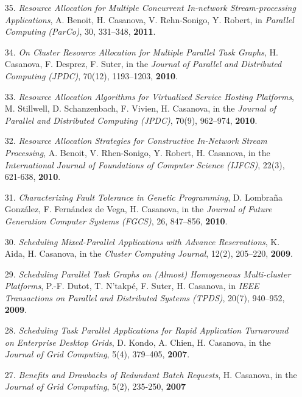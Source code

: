 \begin{enumerate}
\item[35.] {\it Resource Allocation for Multiple Concurrent In-network Stream-processing Applications}, A. Benoit, H. Casanova, V. Rehn-Sonigo, Y. Robert, in \emph{Parallel Computing (ParCo)}, 30, 331--348, {\bf 2011}.

\item[34.] {\it On Cluster Resource Allocation for Multiple Parallel Task Graphs}, H. Casanova, F. Desprez, F. Suter, in the \emph{Journal of Parallel and Distributed Computing (JPDC)}, 70(12), 1193--1203, {\bf 2010}.

\item[33.] {\it Resource Allocation Algorithms for Virtualized Service Hosting Platforms}, M. Stillwell, D. Schanzenbach, F. Vivien, H. Casanova, in the \emph{Journal of Parallel and Distributed Computing (JPDC)}, 70(9), 962--974, {\bf 2010}.

\item[32.] {\it Resource Allocation Strategies for Constructive In-Network Stream Processing}, A. Benoit, V. Rhen-Sonigo, Y. Robert, H. Casanova, in the \emph{International Journal of Foundations of Computer Science (IJFCS)}, 22(3), 621-638, {\bf 2010}.

\item[31.] {\it Characterizing Fault Tolerance in Genetic Programming}, D. Lombraña González, F. Fernández de Vega, H. Casanova, in the \emph{Journal of Future Generation Computer Systems (FGCS)}, 26, 847--856, {\bf 2010}.

\item[30.] {\it Scheduling Mixed-Parallel Applications with Advance
Reservations}, K. Aida, H. Casanova, in the \emph{Cluster Computing
Journal}, 12(2), 205--220, {\bf 2009}.

\item[29.] {\it Scheduling Parallel Task Graphs on (Almost) Homogeneous
Multi-cluster Platforms}, P.-F. Dutot, T. N'takp\'e, F. Suter, H. Casanova,
in \emph{IEEE Transactions on Parallel and Distributed Systems (TPDS)}, 20(7), 940--952, {\bf 2009}.

\item[28.] {\it Scheduling Task Parallel Applications for Rapid Application Turnaround on Enterprise Desktop Grids}, D. Kondo, A. Chien, H. Casanova,  in the \emph{Journal of Grid Computing}, 5(4), 379--405, {\bf 2007}.

\item[27.] {\it Benefits and Drawbacks of Redundant Batch Requests}, H. Casanova, in the \emph{Journal of Grid Computing}, 5(2), 235-250, {\bf 2007}


\end{enumerate}
